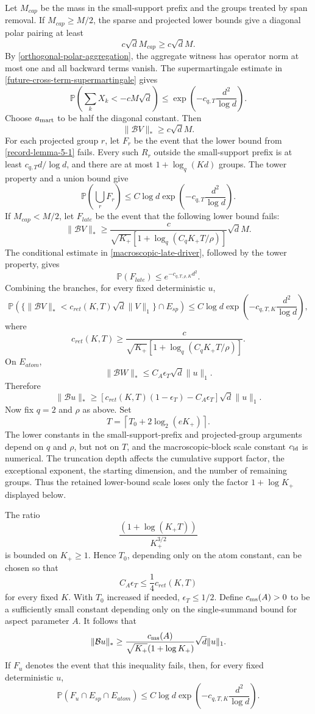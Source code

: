 \documentclass[11pt]{article}
\numberwithin{equation}{section}
\theoremstyle{definition}
\theoremstyle{remark}
\newcommand{\Pp}{\mathbb P}
\newcommand{\1}{\boldsymbol 1}
\begin{document}
\begin{aiblock}
Let $M_{cap}$ be the mass in the small-support prefix
and the groups treated by span removal. If $M_{cap}\ge
M/2$, the sparse and projected lower bounds give a
diagonal polar pairing at least
\[
  c\sqrt dM_{cap}\ge c\sqrt dM.
\]
By \cref{orthogonal-polar-aggregation}, the aggregate
witness has operator norm at most one and all backward
terms vanish. The supermartingale estimate in
\cref{future-cross-term-supermartingale} gives
\[
  \Pp\left(\sum_kX_k<-cM\sqrt d\right)\le
  \exp\left(-c_{q,T}\frac{d^2}{\log d}\right).
\]
Choose $a_{\rm mart}$ to be half the diagonal constant.
Then
\[
  \|\mathcal{B}V\|_*\ge c\sqrt dM.
\]
For each projected group $r$, let $F_r$ be the event
that the lower bound from \cref{record-lemma-5-1} fails.
Every such $R_r$ outside the small-support prefix is at
least $c_{q,T}d/\log d$, and there are at most
$1+\log_q(Kd)$ groups. The tower property and a union
bound give
\[
  \Pp\left(\bigcup_rF_r\right)\le C\log
  d\exp\left(-c_{q,T}\frac{d^2}{\log d}\right).
\]
If $M_{cap}<M/2$, let $F_{late}$ be the event that the
following lower bound fails:
\[
  \|\mathcal{B}V\|_* \ge \frac{c}
  {\sqrt{K_+}[1+\log_q(C_qK_+T/\rho)]}\sqrt dM.
\]
The conditional estimate in
\cref{macroscopic-late-driver}, followed by the tower
property, gives
\[
  \Pp(F_{late})\le e^{-c_{q,T,\rho,K}d^2}.
\]
Combining the branches, for every fixed deterministic
$u$,
\[
  \Pp\left(\{\|\mathcal{B}V\|_*<c_{ret}(K,T)\sqrt d
  \|V\|_1\}\cap E_{sp}\right) \le C\log
  d\exp\left(-c_{q,T,K}\frac{d^2}{\log d}\right),
\]
where
\[
  c_{ret}(K,T) \ge \frac{c}
  {\sqrt{K_+}[1+\log_q(C_qK_+T/\rho)]}.
\]
On $E_{atom}$,
\[
  \|\mathcal{B}W\|_*\le C_A\epsilon_T\sqrt d\|u\|_1.
\]
Therefore
\[
  \|\mathcal{B}u\|_* \ge \left[c_{ret}(K,T)(1-
  \epsilon_T)-C_A\epsilon_T\right]\sqrt d\|u\|_1.
\]
Now fix $q=2$ and $\rho$ as above. Set
\[
  T=\left\lceil T_0+2\log_2(eK_+)\right\rceil.
\]
The lower constants in the small-support-prefix and
projected-group arguments depend on $q$ and $\rho$, but
not on $T$, and the macroscopic-block scale constant
$c_{\rm ld}$ is numerical. The truncation depth affects
the cumulative support factor, the exceptional exponent,
the starting dimension, and the number of remaining
groups. Thus the retained lower-bound scale loses only
the factor $1+\log K_+$ displayed below.

The ratio
\[
  \frac{(1+\log(K_+T))}{K_+^{3/2}}
\]
is bounded on $K_+\ge1$. Hence $T_0$, depending only on
the atom constant, can be chosen so that
\[
  C_A\epsilon_T\le\frac14c_{ret}(K,T)
\]
for every fixed $K$. With $T_0$ increased if needed,
$\epsilon_T\le1/2$. Define $c_{\rm ms}(A)>0$ to be a
sufficiently small constant depending only on the
single-summand bound for aspect parameter $A$. It follows
that
\[
  \|\mathcal{B}u\|_* \ge \frac{c_{\rm ms}(A)}
  {\sqrt{K_+}(1+\log K_+)}\sqrt d\|u\|_1.
\]
If $F_u$ denotes the event that this inequality fails,
then, for every fixed deterministic $u$,
\[
  \Pp(F_u\cap E_{sp}\cap E_{atom})\le C\log
  d\exp\left(-c_{q,T,K}\frac{d^2}{\log d}\right).
\]


\end{aiblock}
\end{document}
